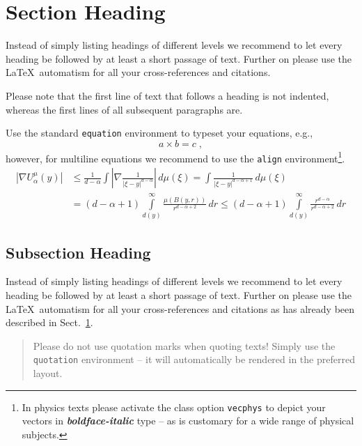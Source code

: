 \section{Section Heading}
\label{sec:2}
Instead of simply listing headings of different levels we recommend to let every heading be followed by at least a short passage of text. Further on please use the \LaTeX\ automatism for all your cross-references and citations.

Please note that the first line of text that follows a heading is not indented, whereas the first lines of all subsequent paragraphs are.

Use the standard \verb|equation| environment to typeset your equations, e.g.,
%
\begin{equation}
a \times b = c\;,
\end{equation}
%
however, for multiline equations we recommend to use the \verb|align| environment\footnote{In physics texts please activate the class option \texttt{vecphys} to depict your vectors in \textbf{\itshape boldface-italic} type -- as is customary for a wide range of physical subjects.}.
\begin{align}
\left|\nabla U_{\alpha}^{\mu}(y)\right| &\le\frac1{d-\alpha}\int
\left|\nabla\frac1{|\xi-y|^{d-\alpha}}\right|\,d\mu(\xi) =
\int \frac1{|\xi-y|^{d-\alpha+1}} \,d\mu(\xi)  \\
&=(d-\alpha+1) \int\limits_{d(y)}^\infty
\frac{\mu(B(y,r))}{r^{d-\alpha+2}}\,dr \le (d-\alpha+1)
\int\limits_{d(y)}^\infty \frac{r^{d-\alpha}}{r^{d-\alpha+2}}\,dr
\label{eq:01}
\end{align}

\subsection{Subsection Heading}
\label{subsec:2}
Instead of simply listing headings of different levels we recommend to let every heading be followed by at least a short passage of text. Further on please use the \LaTeX\ automatism for all your cross-references and citations as has already been described in Sect.~\ref{sec:2}.

\begin{quotation}
Please do not use quotation marks when quoting texts! Simply use the \verb|quotation| environment -- it will automatically be rendered in the preferred layout.
\end{quotation}

